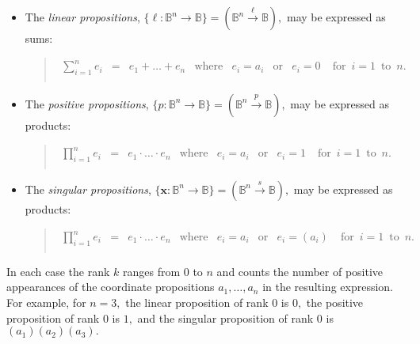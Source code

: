 \documentclass[12pt]{article}
\begin{document}
\begin{itemize}

\item
The \textit{linear propositions}, $\{ \ell : \mathbb{B}^n \to \mathbb{B} \} = (\mathbb{B}^n \xrightarrow{\ell} \mathbb{B}),$ may be expressed as sums:

\begin{quote}$\begin{matrix}
\sum_{i=1}^n e_i &
= &
e_1 + \ldots + e_n &
\operatorname{where} &
e_i = a_i &
\operatorname{or} &
e_i = 0 &
\operatorname{for}\ i = 1\ \operatorname{to}\ n. \\
\end{matrix}$\end{quote}

\item
The \textit{positive propositions}, $\{ p : \mathbb{B}^n \to \mathbb{B} \} = (\mathbb{B}^n \xrightarrow{p} \mathbb{B}),$ may be expressed as products:

\begin{quote}$\begin{matrix}
\prod_{i=1}^n e_i &
= &
e_1 \cdot \ldots \cdot e_n &
\operatorname{where} &
e_i = a_i &
\operatorname{or} &
e_i = 1 &
\operatorname{for}\ i = 1\ \operatorname{to}\ n. \\
\end{matrix}$\end{quote}

\item
The \textit{singular propositions}, $\{ \mathbf{x} : \mathbb{B}^n \to \mathbb{B} \} = (\mathbb{B}^n \xrightarrow{s} \mathbb{B}),$ may be expressed as products:

\begin{quote}$\begin{matrix}
\prod_{i=1}^n e_i &
= &
e_1 \cdot \ldots \cdot e_n &
\operatorname{where} &
e_i = a_i &
\operatorname{or} &
e_i = (a_i) &
\operatorname{for}\ i = 1\ \operatorname{to}\ n. \\
\end{matrix}$\end{quote}

\end{itemize}

In each case the rank $k$ ranges from $0$ to $n$ and counts the number of positive appearances of the coordinate propositions $a_1, \ldots, a_n$ in the resulting expression.  For example, for $n = 3,$ the linear proposition of rank $0$ is $0,$ the positive proposition of rank $0$ is $1,$ and the singular proposition of rank $0$ is $(a_1)(a_2)(a_3).$
\end{document}
